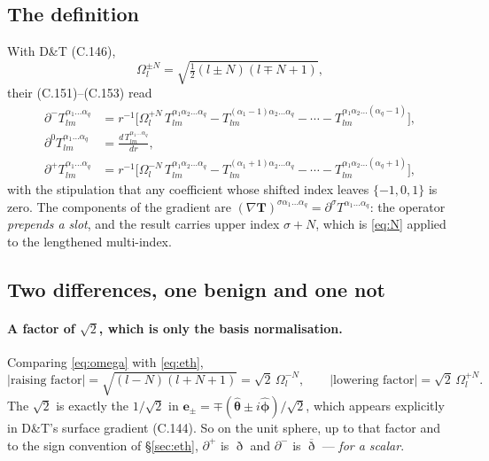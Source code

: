 \documentclass[11pt,a4paper]{article}
\newcommand{\ebasis}[1]{\mathbf{e}_{#1}}
\newcommand{\conj}[1]{\overline{#1}}
\begin{document}
\subsection{The definition}

With D\&T (C.146),
\begin{equation}
  \Omega^{\pm N}_{l} = \sqrt{\tfrac{1}{2}(l \pm N)(l \mp N + 1)},
  \label{eq:omega}
\end{equation}
their (C.151)--(C.153) read
\begin{align}
  \partial^{-} T^{\alpha_1\ldots\alpha_q}_{lm}
    &= r^{-1}\Big[\Omega^{+N}_{l}\, T^{\alpha_1\alpha_2\ldots\alpha_q}_{lm}
      - T^{(\alpha_1-1)\alpha_2\ldots\alpha_q}_{lm}
      - \cdots
      - T^{\alpha_1\alpha_2\ldots(\alpha_q-1)}_{lm}\Big],
    \label{eq:dminus}\\
  \partial^{0} T^{\alpha_1\ldots\alpha_q}_{lm}
    &= \frac{d\,T^{\alpha_1\ldots\alpha_q}_{lm}}{dr},
    \label{eq:dzero}\\
  \partial^{+} T^{\alpha_1\ldots\alpha_q}_{lm}
    &= r^{-1}\Big[\Omega^{-N}_{l}\, T^{\alpha_1\alpha_2\ldots\alpha_q}_{lm}
      - T^{(\alpha_1+1)\alpha_2\ldots\alpha_q}_{lm}
      - \cdots
      - T^{\alpha_1\alpha_2\ldots(\alpha_q+1)}_{lm}\Big],
    \label{eq:dplus}
\end{align}
with the stipulation that any coefficient whose shifted index leaves
$\{-1,0,1\}$ is zero.  The components of the gradient are
$(\nabla\mathbf{T})^{\sigma\alpha_1\ldots\alpha_q} = \partial^{\sigma}
T^{\alpha_1\ldots\alpha_q}$: the operator \emph{prepends a slot}, and the
result carries upper index $\sigma + N$, which is \eqref{eq:N} applied to
the lengthened multi-index.

\subsection{Two differences, one benign and one not}

\paragraph{A factor of $\sqrt2$, which is only the basis normalisation.}
Comparing \eqref{eq:omega} with \eqref{eq:eth},
\begin{equation}
  \left|\text{raising factor}\right| = \sqrt{(l-N)(l+N+1)}
    = \sqrt{2}\,\Omega^{-N}_{l},
  \qquad
  \left|\text{lowering factor}\right| = \sqrt{2}\,\Omega^{+N}_{l}.
  \label{eq:ethomega}
\end{equation}
The $\sqrt2$ is exactly the $1/\sqrt2$ in $\ebasis{\pm} = \mp(
\hat{\boldsymbol{\theta}} \pm i\hat{\boldsymbol{\phi}})/\sqrt2$, which
appears explicitly in D\&T's surface gradient (C.144).  So on the unit
sphere, up to that factor and to the sign convention of
\S\ref{sec:eth}, $\partial^{+}$ is $\eth$ and $\partial^{-}$ is
$\conj{\eth}$ --- \emph{for a scalar}.
\end{document}
